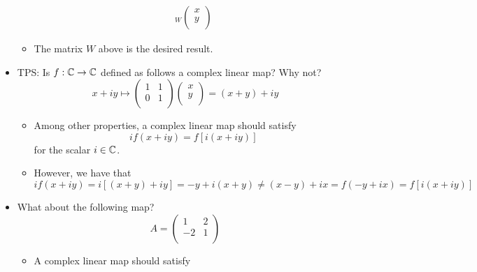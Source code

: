 \documentclass[../notes.tex]{subfiles}
\begin{document}
\begin{itemize}
\begin{itemize}
\begin{align*}
{                }_W
                \begin{pmatrix}
                    x\\
                    y\\
                \end{pmatrix}
        \end{align*}
        \item The matrix $W$ above is the desired result.
    \end{itemize}
    \item TPS: Is $f:\mathbb{C}\to\mathbb{C}$ defined as follows a complex linear map? Why not?
    \begin{equation*}
        x+iy \mapsto
        \begin{pmatrix}
            1 & 1\\
            0 & 1\\
        \end{pmatrix}
        \begin{pmatrix}
            x\\
            y\\
        \end{pmatrix}
        = (x+y)+iy
    \end{equation*}
    \begin{itemize}
        \item Among other properties, a complex linear map should satisfy
        \begin{equation*}
            if(x+iy) = f[i(x+iy)]
        \end{equation*}
        for the scalar $i\in\mathbb{C}$.
        \item However, we have that
        \begin{equation*}
            if(x+iy) = i[(x+y)+iy]
            = -y+i(x+y)
            \neq (x-y)+ix
            = f(-y+ix)
            = f[i(x+iy)]
        \end{equation*}
    \end{itemize}
    \item What about the following map?
    \begin{equation*}
        A =
        \begin{pmatrix}
            1 & 2\\
            -2 & 1\\
        \end{pmatrix}
    \end{equation*}
    \begin{itemize}
        \item A complex linear map should satisfy

\end{itemize}
\end{itemize}
\end{document}
